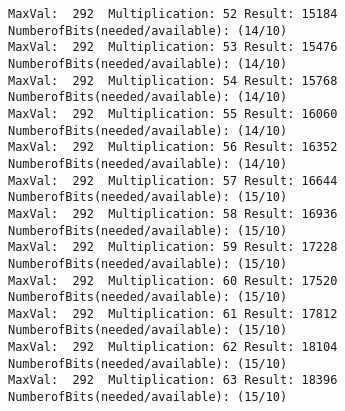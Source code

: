 \documentclass{article}
\begin{document}
\begin{Verbatim}[commandchars=\\\{\}]
MaxVal:  292  Multiplication: 52 Result: 15184 NumberofBits(needed/available): (14/10)
MaxVal:  292  Multiplication: 53 Result: 15476 NumberofBits(needed/available): (14/10)
MaxVal:  292  Multiplication: 54 Result: 15768 NumberofBits(needed/available): (14/10)
MaxVal:  292  Multiplication: 55 Result: 16060 NumberofBits(needed/available): (14/10)
MaxVal:  292  Multiplication: 56 Result: 16352 NumberofBits(needed/available): (14/10)
MaxVal:  292  Multiplication: 57 Result: 16644 NumberofBits(needed/available): (15/10)
MaxVal:  292  Multiplication: 58 Result: 16936 NumberofBits(needed/available): (15/10)
MaxVal:  292  Multiplication: 59 Result: 17228 NumberofBits(needed/available): (15/10)
MaxVal:  292  Multiplication: 60 Result: 17520 NumberofBits(needed/available): (15/10)
MaxVal:  292  Multiplication: 61 Result: 17812 NumberofBits(needed/available): (15/10)
MaxVal:  292  Multiplication: 62 Result: 18104 NumberofBits(needed/available): (15/10)
MaxVal:  292  Multiplication: 63 Result: 18396 NumberofBits(needed/available): (15/10)
    \end{Verbatim}


    
    
    
    
\end{document}

